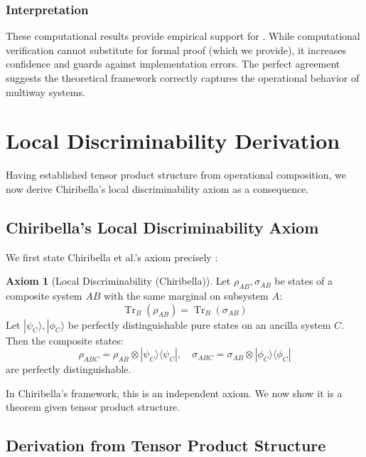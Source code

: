 \documentclass[11pt,a4paper]{article}
\theoremstyle{definition}
\newtheorem{axiom}[theorem]{Axiom}
\theoremstyle{remark}
\DeclareMathOperator{\Tr}{Tr}
\newcommand{\ket}[1]{|#1\rangle}
\newcommand{\ketbra}[2]{|#1\rangle\langle#2|}
\begin{document}
\subsubsection{Interpretation}

These computational results provide empirical support for . While computational verification cannot substitute for formal proof (which we provide), it increases confidence and guards against implementation errors. The perfect agreement suggests the theoretical framework correctly captures the operational behavior of multiway systems.

\section{Local Discriminability Derivation}
\label{sec:ld}

Having established tensor product structure from operational composition, we now derive Chiribella's local discriminability axiom as a consequence.

\subsection{Chiribella's Local Discriminability Axiom}

We first state Chiribella et al.'s axiom precisely \cite{chiribella2011informational}:

\begin{axiom}[Local Discriminability (Chiribella)]
\label{ax:ld_chiribella}
Let $\rho_{AB}, \sigma_{AB}$ be states of a composite system $AB$ with the same marginal on subsystem $A$:
\begin{equation}
\Tr_B(\rho_{AB}) = \Tr_B(\sigma_{AB})
\end{equation}
Let $\ket{\psi_C}, \ket{\phi_C}$ be perfectly distinguishable pure states on an ancilla system $C$. Then the composite states:
\begin{equation}
\rho_{ABC} = \rho_{AB} \otimes \ketbra{\psi_C}{\psi_C}, \quad \sigma_{ABC} = \sigma_{AB} \otimes \ketbra{\phi_C}{\phi_C}
\end{equation}
are perfectly distinguishable.
\end{axiom}

In Chiribella's framework, this is an independent axiom. We now show it is a theorem given tensor product structure.

\subsection{Derivation from Tensor Product Structure}
\end{document}
